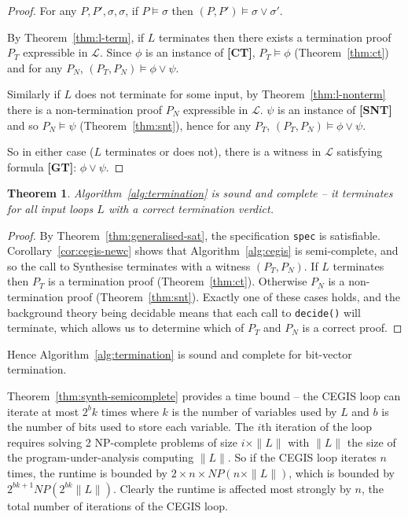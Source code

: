 \documentclass[preprint]{sigplanconf}
\newtheorem{theorem}{Theorem}
\theoremstyle{definition}
\begin{document}
\begin{proof}
 For any $P, P', \sigma, \sigma$, if $P \models \sigma$ then $(P, P') \models \sigma \vee \sigma'$.

 By Theorem~\ref{thm:l-term}, if $L$ terminates then there exists a termination proof $P_T$ expressible
 in $\mathcal{L}$.  Since $\phi$ is an instance of {\bf [CT]}, $P_T \models \phi$ (Theorem~\ref{thm:ct}) and
 for any $P_N$, $(P_T, P_N) \models \phi \vee \psi$.

 Similarly if $L$ does not terminate for some input, by Theorem~\ref{thm:l-nonterm} there is a non-termination
 proof $P_N$ expressible in $\mathcal{L}$.  $\psi$ is an instance of {\bf [SNT]} and so $P_N \models \psi$
 (Theorem~\ref{thm:snt}), hence for any $P_T$, $(P_T, P_N) \models \phi \vee \psi$.

 So in either case ($L$ terminates or does not), there is a witness in $\mathcal{L}$ satisfying
 formula {\bf [GT]}: $\phi \vee \psi$.
\end{proof}

\begin{theorem}
 Algorithm~\ref{alg:termination} is sound and complete -- it terminates for all input loops $L$ with
 a correct termination verdict.
\end{theorem}

\begin{proof}
 By Theorem~\ref{thm:generalised-sat}, the specification \lstinline!spec! is satisfiable.  Corollary~\ref{cor:cegis-newc}
 shows that Algorithm~\ref{alg:cegis} is semi-complete, and so the call to {\sc Synthesise} terminates with a witness $(P_T, P_N)$.
 If $L$ terminates then $P_T$ is a termination proof (Theorem~\ref{thm:ct}).  Otherwise $P_N$ is a non-termination proof
 (Theorem~\ref{thm:snt}).  Exactly one of these cases holds, and the background theory being decidable means that each
 call to \lstinline|decide()| will terminate, which allows us to determine which of $P_T$ and $P_N$ is a correct proof.
\end{proof}

Hence Algorithm~\ref{alg:termination} is sound and complete for bit-vector termination.

Theorem~\ref{thm:synth-semicomplete} provides a time bound -- the CEGIS loop can iterate at most
$2^bk$ times where $k$ is the number of variables used by $L$ and
$b$ is the number of bits used to store each variable.
The $i$th iteration of the loop requires solving 2 NP-complete problems of size $i \times \| L\|$
with $\| L \| $ the size of the program-under-analysis computing $\| L \|$.  So if 
the CEGIS loop iterates $n$ times, the
runtime is bounded by $2 \times n \times NP(n \times \| L \|)$, which is bounded
by $2^{bk + 1} NP(2^{bk} \| L \|)$.  Clearly the runtime is affected most strongly by $n$,
the total number of iterations of the CEGIS loop.
\end{document}
